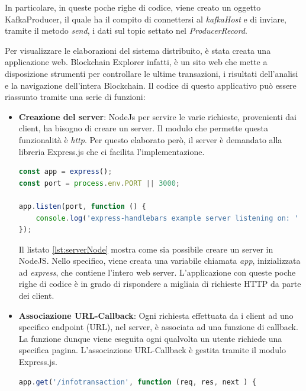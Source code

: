 \begin{itemize}
\begin{itemize}
In particolare, in queste poche righe di codice, viene creato un oggetto KafkaProducer, il quale ha il compito di connettersi al \textit{kafkaHost} e di inviare, tramite il metodo \textit{send}, i dati sul topic settato nel \textit{ProducerRecord}. 

\end{itemize}
\end{itemize} 

Per visualizzare le elaborazioni del sistema distribuito, è stata creata una applicazione web. Blockchain Explorer infatti, è un sito web che mette a disposizione strumenti per controllare le ultime transazioni, i risultati dell'analisi e la navigazione dell'intera Blockchain. Il codice di questo applicativo può essere riassunto tramite una serie di funzioni:

\begin{itemize}
\item \textbf{Creazione del server}: NodeJs per servire le varie richieste, provenienti dai client, ha bisogno di creare un server. Il modulo che permette questa funzionalità è \textit{http}. Per questo elaborato però, il server è demandato alla libreria Express.js che ci facilita l'implementazione.

\begin{lstlisting}[language=Javascript, label=lst:serverNode, caption={Creazione server in NodeJS.}]
const app = express();
const port = process.env.PORT || 3000;

app.listen(port, function () {
    console.log('express-handlebars example server listening on: ' + port);
});
\end{lstlisting}
Il listato \ref{lst:serverNode} mostra come sia possibile creare un server in NodeJS. Nello specifico, viene creata una variabile chiamata \textit{app}, inizializzata ad \textit{express}, che contiene l'intero web server. L'applicazione con queste poche righe di codice è in grado di rispondere a migliaia di richieste HTTP da parte dei client.

\item \textbf{Associazione URL-Callback}: Ogni richiesta effettuata da i client ad uno specifico endpoint (URL), nel server, è associata ad una funzione di callback. La funzione dunque viene eseguita ogni qualvolta un utente richiede una specifica pagina. L'associazione URL-Callback è gestita tramite il modulo Express.js.

\begin{lstlisting}[language=Javascript, label=lst:express, caption={Associazione URL-Callback in Express.}]
app.get('/infotransaction', function (req, res, next ) {


\end{lstlisting}
\end{itemize}
